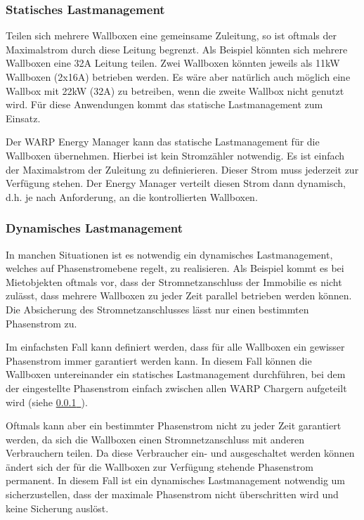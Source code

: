 \documentclass[a4paper,10pt]{article}
\newcommand*{\fullref}[1]{\hyperref[{#1}]{\ref*{#1}~\nameref*{#1}}}
\begin{document}
\begin{multicols*}{2}
	\subsubsection{Statisches Lastmanagement}
	\label{statisches_lastmanagement}

	Teilen sich mehrere Wallboxen eine gemeinsame Zuleitung, so ist oftmals der
	Maximalstrom durch diese Leitung begrenzt. Als Beispiel könnten sich mehrere
	Wallboxen eine 32A Leitung teilen. Zwei Wallboxen könnten jeweils als 11kW
	Wallboxen (2x16A) betrieben werden. Es wäre aber natürlich auch möglich eine
	Wallbox mit 22kW (32A) zu betreiben, wenn die zweite Wallbox nicht genutzt
	wird. Für diese Anwendungen kommt das statische Lastmanagement zum Einsatz.

	Der WARP Energy Manager kann das statische Lastmanagement für die Wallboxen
	übernehmen. Hierbei ist kein Stromzähler notwendig. Es ist einfach der
	Maximalstrom der Zuleitung zu definierieren. Dieser Strom muss jederzeit zur
	Verfügung stehen. Der Energy Manager verteilt diesen Strom dann dynamisch,
	d.h. je nach Anforderung, an die kontrollierten Wallboxen.

	\subsubsection{Dynamisches Lastmanagement}
	\label{dynamisches_lastmanagement}

	In manchen Situationen ist es notwendig ein dynamisches Lastmanagement,
	welches auf Phasenstromebene regelt, zu realisieren. 
	Als Beispiel kommt es bei Mietobjekten oftmals vor, dass der
	Stromnetzanschluss der Immobilie es nicht zulässt, dass mehrere Wallboxen
	zu jeder Zeit parallel betrieben werden können. Die Absicherung des
	Stromnetzanschlusses lässt nur einen bestimmten Phasenstrom zu.

	Im einfachsten Fall kann definiert werden, dass für alle Wallboxen ein
	gewisser Phasenstrom immer garantiert werden kann. In diesem Fall können
	die Wallboxen untereinander ein statisches Lastmanagement durchführen, bei
	dem der eingestellte Phasenstrom einfach zwischen allen WARP Chargern
	aufgeteilt wird (siehe \fullref{statisches_lastmanagement}).

	Oftmals kann aber ein bestimmter Phasenstrom nicht zu jeder Zeit garantiert
	werden, da sich die Wallboxen einen Stromnetzanschluss mit anderen
	Verbrauchern teilen. Da diese Verbraucher ein- und ausgeschaltet werden
	können ändert sich der für die Wallboxen zur Verfügung stehende Phasenstrom
	permanent. In diesem Fall ist ein dynamisches Lastmanagement notwendig um
	sicherzustellen, dass der maximale Phasenstrom nicht überschritten wird und
	keine Sicherung auslöst. 


\end{multicols*}
\end{document}
